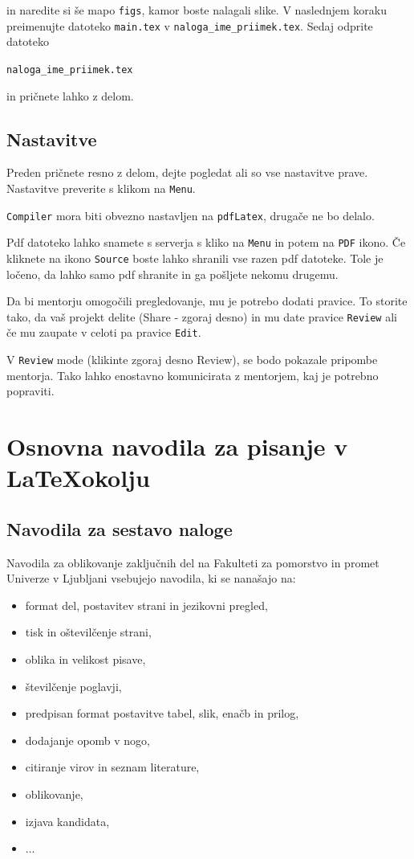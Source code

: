\documentclass[12pt]{article}
\theoremstyle{definition}
\begin{document}
in naredite si še mapo \texttt{figs}, kamor boste nalagali slike. V naslednjem koraku preimenujte datoteko \texttt{main.tex} v \texttt{naloga\_ime\_priimek.tex}. Sedaj odprite datoteko

\texttt{naloga\_ime\_priimek.tex}

in pričnete lahko z delom.

%
\subsection{Nastavitve}

Preden pričnete resno z delom, dejte pogledat ali so vse nastavitve prave. Nastavitve preverite s klikom na \texttt{Menu}.

\texttt{Compiler} mora biti obvezno nastavljen na \texttt{pdfLatex}, drugače ne bo delalo. 

Pdf datoteko lahko snamete s serverja s kliko na \texttt{Menu} in potem na \texttt{PDF} ikono. Če kliknete na ikono \texttt{Source} boste lahko shranili vse razen pdf datoteke. Tole je ločeno, da lahko samo pdf shranite in ga pošljete nekomu drugemu.

Da bi mentorju omogočili pregledovanje, mu je potrebo dodati pravice. To storite tako, da vaš projekt delite (Share - zgoraj desno) in mu date pravice \texttt{Review} ali če mu zaupate v celoti pa pravice \texttt{Edit}.

V \texttt{Review} mode (klikinte zgoraj desno Review), se bodo pokazale pripombe mentorja. Tako lahko enostavno komunicirata z mentorjem, kaj je potrebno popraviti. 


\newpage
\section{Osnovna navodila za pisanje v \LaTeX okolju}
\label{sec:Navodila}

\subsection{Navodila za sestavo naloge}

Navodila za oblikovanje zaključnih del na Fakulteti za pomorstvo in promet Univerze v Ljubljani vsebujejo navodila, ki se nanašajo na:

\begin{itemize}[nosep]
	\item format del, postavitev strani in jezikovni pregled,
	\item tisk in oštevilčenje strani,
	\item oblika in velikost pisave,
	\item številčenje poglavji,
	\item predpisan format postavitve tabel, slik, enačb in prilog,
	\item dodajanje opomb v nogo,
	\item citiranje virov in seznam literature,
	\item oblikovanje,
	\item izjava kandidata,
	\item $\dots$	
\end{itemize}
\end{document}
